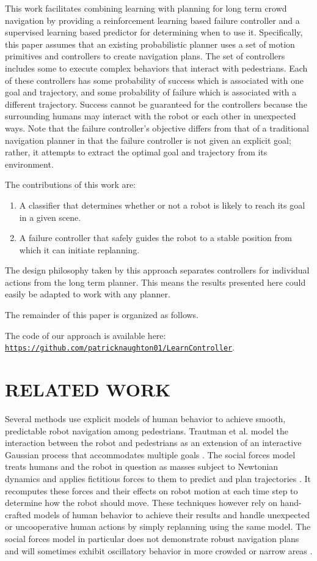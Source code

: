\documentclass[letterpaper, 10 pt, conference]{ieeeconf}  %
\begin{document}
	This work facilitates combining learning with planning for long term crowd navigation by providing a reinforcement learning based failure controller and a supervised learning based predictor for determining when to use it. Specifically, this paper assumes that an existing probabilistic planner uses a set of motion primitives and controllers to create navigation plans. The set of controllers includes some to execute complex behaviors that interact with pedestrians. Each of these controllers has some probability of success which is associated with one goal and trajectory, and some probability of failure which is associated with a different trajectory. Success cannot be guaranteed for the controllers because the surrounding humans may interact with the robot or each other in unexpected ways. Note that the failure controller's objective differs from that of a traditional navigation planner in that the failure controller is not given an explicit goal; rather, it attempts to extract the optimal goal and trajectory from its environment.

	The contributions of this work are:
	\begin{enumerate}
		\item A classifier that determines whether or not a robot is likely to reach its goal in a given scene.
		\item A failure controller that safely guides the robot to a stable position from which it can initiate replanning.
	\end{enumerate}
	The design philosophy taken by this approach separates controllers for individual actions from the long term planner. This means the results presented here could easily be adapted to work with any planner.
	
	The remainder of this paper is organized as follows. 
	
	The code of our approach is available here: \texttt{\url{https://github.com/patricknaughton01/LearnController}}.
	

\section{RELATED WORK}\label{sec:relatedwork}
	Several methods use explicit models of human behavior to achieve smooth, predictable robot navigation among pedestrians. Trautman et al. model the interaction between the robot and pedestrians as an extension of an interactive Gaussian process that accommodates multiple goals \cite{caseforcoop}. The social forces model treats humans and the robot in question as masses subject to Newtonian dynamics and applies fictitious forces to them to predict and plan trajectories \cite{sfm}. It recomputes these forces and their effects on robot motion at each time step to determine how the robot should move. These techniques however rely on hand-crafted models of human behavior to achieve their results and handle unexpected or uncooperative human actions by simply replanning using the same model. The social forces model in particular does not demonstrate robust navigation plans and will sometimes exhibit oscillatory behavior in more crowded or narrow areas \cite{sfm}.
	
\end{document}
